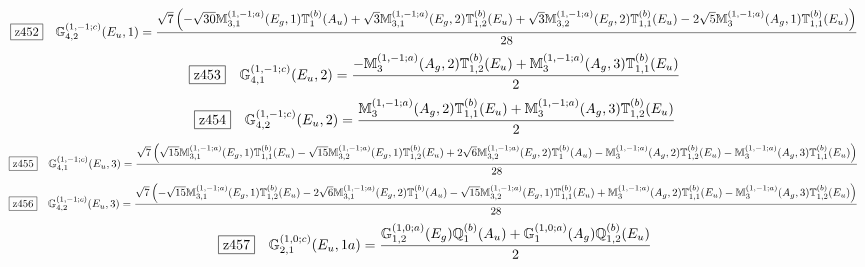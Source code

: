 \documentclass[fleqn,10pt,landscape]{jsarticle}
\begin{document}
\begin{dmath*}
\hspace*{3mm}\fbox{z452}\quad \mathbb{G}_{4,2}^{(1,-1;c)}(E_{u},1)=\frac{\sqrt{7} \left(- \sqrt{30} \mathbb{M}_{3,1}^{(1,-1;a)}(E_{g},1) \mathbb{T}_{1}^{(b)}(A_{u}) + \sqrt{3} \mathbb{M}_{3,1}^{(1,-1;a)}(E_{g},2) \mathbb{T}_{1,2}^{(b)}(E_{u}) + \sqrt{3} \mathbb{M}_{3,2}^{(1,-1;a)}(E_{g},2) \mathbb{T}_{1,1}^{(b)}(E_{u}) - 2 \sqrt{5} \mathbb{M}_{3}^{(1,-1;a)}(A_{g},1) \mathbb{T}_{1,1}^{(b)}(E_{u})\right)}{28}
\end{dmath*}
\begin{dmath*}
\hspace*{3mm}\fbox{z453}\quad \mathbb{G}_{4,1}^{(1,-1;c)}(E_{u},2)=\frac{- \mathbb{M}_{3}^{(1,-1;a)}(A_{g},2) \mathbb{T}_{1,2}^{(b)}(E_{u}) + \mathbb{M}_{3}^{(1,-1;a)}(A_{g},3) \mathbb{T}_{1,1}^{(b)}(E_{u})}{2}
\end{dmath*}
\begin{dmath*}
\hspace*{3mm}\fbox{z454}\quad \mathbb{G}_{4,2}^{(1,-1;c)}(E_{u},2)=\frac{\mathbb{M}_{3}^{(1,-1;a)}(A_{g},2) \mathbb{T}_{1,1}^{(b)}(E_{u}) + \mathbb{M}_{3}^{(1,-1;a)}(A_{g},3) \mathbb{T}_{1,2}^{(b)}(E_{u})}{2}
\end{dmath*}
\begin{dmath*}
\hspace*{3mm}\fbox{z455}\quad \mathbb{G}_{4,1}^{(1,-1;c)}(E_{u},3)=\frac{\sqrt{7} \left(\sqrt{15} \mathbb{M}_{3,1}^{(1,-1;a)}(E_{g},1) \mathbb{T}_{1,1}^{(b)}(E_{u}) - \sqrt{15} \mathbb{M}_{3,2}^{(1,-1;a)}(E_{g},1) \mathbb{T}_{1,2}^{(b)}(E_{u}) + 2 \sqrt{6} \mathbb{M}_{3,2}^{(1,-1;a)}(E_{g},2) \mathbb{T}_{1}^{(b)}(A_{u}) - \mathbb{M}_{3}^{(1,-1;a)}(A_{g},2) \mathbb{T}_{1,2}^{(b)}(E_{u}) - \mathbb{M}_{3}^{(1,-1;a)}(A_{g},3) \mathbb{T}_{1,1}^{(b)}(E_{u})\right)}{28}
\end{dmath*}
\begin{dmath*}
\hspace*{3mm}\fbox{z456}\quad \mathbb{G}_{4,2}^{(1,-1;c)}(E_{u},3)=\frac{\sqrt{7} \left(- \sqrt{15} \mathbb{M}_{3,1}^{(1,-1;a)}(E_{g},1) \mathbb{T}_{1,2}^{(b)}(E_{u}) - 2 \sqrt{6} \mathbb{M}_{3,1}^{(1,-1;a)}(E_{g},2) \mathbb{T}_{1}^{(b)}(A_{u}) - \sqrt{15} \mathbb{M}_{3,2}^{(1,-1;a)}(E_{g},1) \mathbb{T}_{1,1}^{(b)}(E_{u}) + \mathbb{M}_{3}^{(1,-1;a)}(A_{g},2) \mathbb{T}_{1,1}^{(b)}(E_{u}) - \mathbb{M}_{3}^{(1,-1;a)}(A_{g},3) \mathbb{T}_{1,2}^{(b)}(E_{u})\right)}{28}
\end{dmath*}
\begin{dmath*}
\hspace*{3mm}\fbox{z457}\quad \mathbb{G}_{2,1}^{(1,0;c)}(E_{u},1a)=\frac{\mathbb{G}_{1,2}^{(1,0;a)}(E_{g}) \mathbb{Q}_{1}^{(b)}(A_{u}) + \mathbb{G}_{1}^{(1,0;a)}(A_{g}) \mathbb{Q}_{1,2}^{(b)}(E_{u})}{2}
\end{dmath*}
\end{document}
